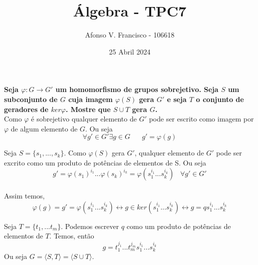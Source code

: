 \documentclass{article}
\title{Álgebra - TPC7}
\author{Afonso V. Francisco - 106618 }
\date{25 Abril 2024}
\begin{document}
\maketitle


 \textbf{Seja $\varphi : G \rightarrow G'$ um homomorfismo de grupos sobrejetivo. Seja $S$ um subconjunto de $G$ cuja imagem $\varphi(S)$ gera $G'$ e seja $T$ o conjunto de geradores de $ker \varphi$. Mostre que $S\cup T$ gera $G$.}\\

 Como $\varphi$ é sobrejetivo qualquer elemento de $G'$ pode ser escrito como imagem por $\varphi$ de algum elemento de $G$. Ou seja $$\forall g' \in G' \exists g \in G \; \;\;\;\;\;g'=\varphi(g)$$

 Seja $S=\{s_1,...,s_k\}$. Como $\varphi(S)$ gera $G'$, qualquer elemento de $G'$ pode ser excrito como um produto de potências de elementos de S. Ou seja $$g'=\varphi(s_1)^{i_1}...\varphi(s_k)^{i_k}=\varphi(s_1^{i_1}...s_k^{i_k}) \; \; \; \forall g' \in G'$$\\

 Assim temos, $$\varphi(g)=g'=\varphi(s_1^{i_1}...s_k^{i_k}) \leftrightarrow g\in ker(s_1^{i_1}...s_k^{i_k})\leftrightarrow g=qs_1^{i_1}...s_k^{i_k}$$

 Seja $T=\{t_1,...t_m\}$. Podemos escrever $q$ como um produto de potências de elementos de $T$. Temos, então $$g=t_1^{j_1}...t_m^{j_m}s_1^{i_1}...s_k^{i_k}$$ 
Ou seja $G=\langle S,T \rangle= \langle S \cup T \rangle$.
\end{document}
